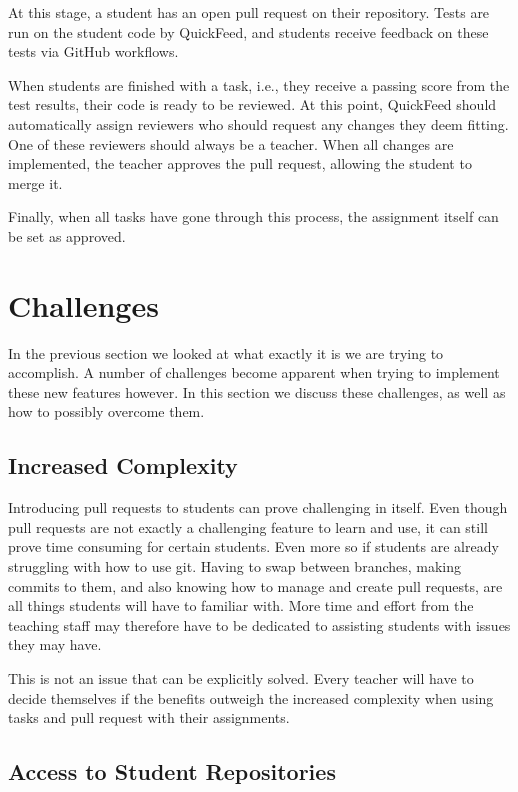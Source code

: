 At this stage, a student has an open pull request on their repository.
Tests are run on the student code by QuickFeed, and students receive feedback on these tests via GitHub workflows.

When students are finished with a task, i.e., they receive a passing score from the test results, their code is ready to be reviewed.
At this point, QuickFeed should automatically assign reviewers who should request any changes they deem fitting.
One of these reviewers should always be a teacher.
When all changes are implemented, the teacher approves the pull request, allowing the student to merge it.

Finally, when all tasks have gone through this process, the assignment itself can be set as approved.

\section{Challenges}

In the previous section we looked at what exactly it is we are trying to accomplish. 
A number of challenges become apparent when trying to implement these new features however.
In this section we discuss these challenges, as well as how to possibly overcome them.

\subsection{Increased Complexity}

Introducing pull requests to students can prove challenging in itself.
Even though pull requests are not exactly a challenging feature to learn and use, it can still prove time consuming for certain students.
Even more so if students are already struggling with how to use git.
Having to swap between branches, making commits to them, and also knowing how to manage and create pull requests, are all things students will have to familiar with.
More time and effort from the teaching staff may therefore have to be dedicated to assisting students with issues they may have.

This is not an issue that can be explicitly solved.
Every teacher will have to decide themselves if the benefits outweigh the increased complexity when using tasks and pull request with their assignments.

\subsection{Access to Student Repositories}

